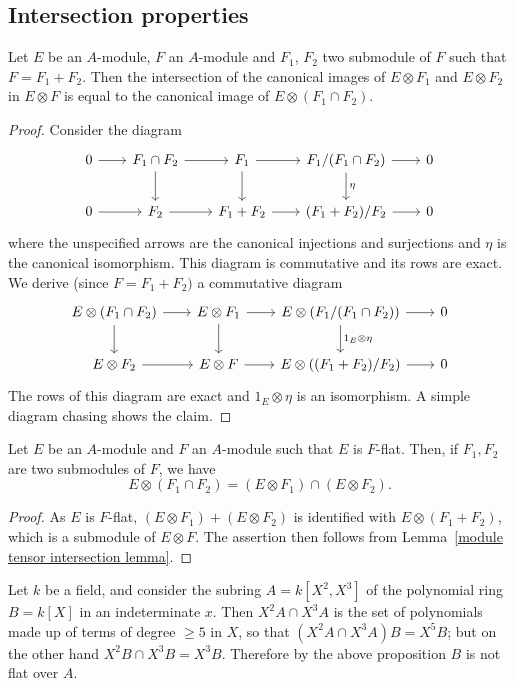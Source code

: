 \subsection{Intersection properties}
\begin{lemma}\label{module tensor intersection lemma}
Let $E$ be an $A$-module, $F$ an $A$-module and $F_1$, $F_2$ two submodule of $F$ such that $F=F_1+F_2$. Then the intersection of the canonical images of $E\otimes F_1$ and $E\otimes F_2$ in $E\otimes F$ is equal to the canonical image of $E\otimes(F_1\cap F_2)$.
\end{lemma}
\begin{proof}
Consider the diagram
\[\begin{tikzcd}[column sep=20pt,row sep=20pt]
0\ar[r]&F_1\cap F_2\ar[r]\ar[d]&F_1\ar[r]\ar[d]&F_1/(F_1\cap F_2)\ar[r]\ar[d,"\eta"]&0\\
0\ar[r]&F_2\ar[r]&F_1+F_2\ar[r]&(F_1+F_2)/F_2\ar[r]&0
\end{tikzcd}\]
where the unspecified arrows are the canonical injections and surjections and $\eta$ is the canonical isomorphism. This diagram is commutative and its rows are exact. We derive (since $F=F_1+F_2)$ a commutative diagram
\[\begin{tikzcd}[column sep=20pt,row sep=20pt]
E\otimes(F_1\cap F_2)\ar[r]\ar[d]&E\otimes F_1\ar[r]\ar[d]&E\otimes(F_1/(F_1\cap F_2))\ar[r]\ar[d,"1_E\otimes\eta"]&0\\
E\otimes F_2\ar[r]&E\otimes F\ar[r]&E\otimes((F_1+F_2)/F_2)\ar[r]&0
\end{tikzcd}\]
The rows of this diagram are exact and $1_E\otimes\eta$ is an isomorphism. A simple diagram chasing shows the claim.
\end{proof}
\begin{proposition}\label{module flat tensor intersection}
Let $E$ be an $A$-module and $F$ an $A$-module such that $E$ is $F$-flat. Then, if $F_1,F_2$ are two submodules of $F$, we have
\[E\otimes(F_1\cap F_2)=(E\otimes F_1)\cap(E\otimes F_2).\]
\end{proposition}
\begin{proof}
As $E$ is $F$-flat, $(E\otimes F_1)+(E\otimes F_2)$ is identified with $E\otimes(F_1+F_2)$, which is a submodule of $E\otimes F$. The assertion then follows from Lemma~\ref{module tensor intersection lemma}.
\end{proof}
\begin{example}
Let $k$ be a field, and consider the subring $A=k[X^2,X^3]$ of the polynomial ring $B=k[X]$ in an indeterminate $x$. Then $X^2A\cap X^3A$ is the set of polynomials made up of terms of degree $\geq 5$ in $X$, so that $(X^2A\cap X^3A)B=X^5B$; but on the other hand $X^2B\cap X^3B=X^3B$. Therefore by the above proposition $B$ is not flat over $A$.
\end{example}
